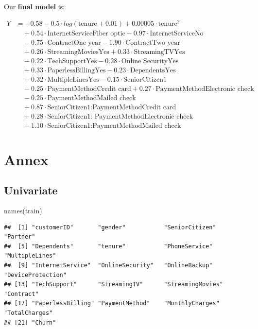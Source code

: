 \documentclass[
  twoside]{article}
\newenvironment{Shaded}{\begin{snugshade}}{\end{snugshade}}
\newcommand{\FunctionTok}[1]{\textcolor[rgb]{0.00,0.00,0.00}{#1}}
\newcommand{\NormalTok}[1]{#1}
\begin{document}
Our \textbf{final model} is:

\[
\begin{aligned}
Y &= -0.58 - 0.5 \cdot log(\text{tenure}+0.01) + 0.00005 \cdot \text{tenure}^2 \\
&\quad + 0.54 \cdot \text{InternetServiceFiber optic} - 0.97 \cdot \text{InternetServiceNo} \\
&\quad - 0.75 \cdot \text{ContractOne year} - 1.90 \cdot \text{ContractTwo year} \\
&\quad + 0.26 \cdot \text{StreamingMoviesYes} + 0.33 \cdot \text{StreamingTVYes} \\
&\quad - 0.22 \cdot \text{TechSupportYes} - 0.28 \cdot \text{Online SecurityYes} \\
&\quad + 0.33 \cdot \text{PaperlessBillingYes} - 0.23 \cdot \text{DependentsYes} \\
&\quad + 0.32 \cdot \text{MultipleLinesYes} - 0.15 \cdot \text{SeniorCitizen1} \\
&\quad - 0.25 \cdot \text{PaymentMethodCredit card} + 0.27 \cdot \text{PaymentMethodElectronic check} \\
&\quad - 0.25 \cdot \text{PaymentMethodMailed check} \\
&\quad + 0.87 \cdot \text{SeniorCitizen1:PaymentMethodCredit card} \\
&\quad + 0.28 \cdot \text{SeniorCitizen1: PaymentMethodElectronic check} \\
&\quad + 1.10 \cdot \text{SeniorCitizen1:PaymentMethodMailed check}
\end{aligned}
\]

\newpage

\hypertarget{annex}{%
\section{Annex}\label{annex}}

\hypertarget{univariate}{%
\subsection{Univariate}\label{univariate}}

\begin{Shaded}
\begin{Highlighting}[]
\FunctionTok{names}\NormalTok{(train)}
\end{Highlighting}
\end{Shaded}

\begin{verbatim}
##  [1] "customerID"       "gender"           "SeniorCitizen"    "Partner"         
##  [5] "Dependents"       "tenure"           "PhoneService"     "MultipleLines"   
##  [9] "InternetService"  "OnlineSecurity"   "OnlineBackup"     "DeviceProtection"
## [13] "TechSupport"      "StreamingTV"      "StreamingMovies"  "Contract"        
## [17] "PaperlessBilling" "PaymentMethod"    "MonthlyCharges"   "TotalCharges"    
## [21] "Churn"
\end{verbatim}
\end{document}
